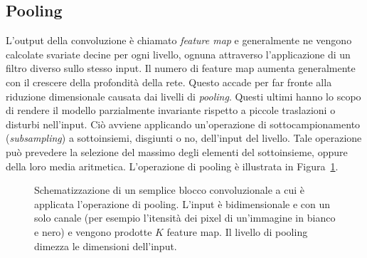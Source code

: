 \subsection{Pooling}
L'output della convoluzione è chiamato \emph{feature map} e generalmente ne
vengono calcolate svariate decine per ogni livello, ognuna attraverso
l'applicazione di un filtro diverso sullo stesso input. Il numero di feature
map aumenta generalmente con il crescere della profondità della rete. Questo
accade per far fronte alla riduzione dimensionale causata dai livelli di
\emph{pooling}. Questi ultimi hanno lo scopo di rendere il modello parzialmente
invariante rispetto a piccole traslazioni o disturbi nell'input. Ciò avviene
applicando un'operazione di sottocampionamento (\emph{subsampling}) a
sottoinsiemi, disgiunti o no, dell'input del livello. Tale operazione può prevedere la
selezione del massimo degli elementi del sottoinsieme, oppure della loro media
aritmetica. L'operazione di pooling è illustrata in Figura~\ref{fig:pooling}.
\begin{figure}[!htp]
  \caption{%
    Schematizzazione di un semplice blocco convoluzionale a cui è applicata
    l'operazione di pooling. L'input è bidimensionale e con un solo canale (per
    esempio l'itensità dei pixel di un'immagine in bianco e nero) e vengono
    prodotte \(K\) feature map. Il livello di pooling dimezza le dimensioni
    dell'input.
  }%
  \label{fig:pooling}
\end{figure}



